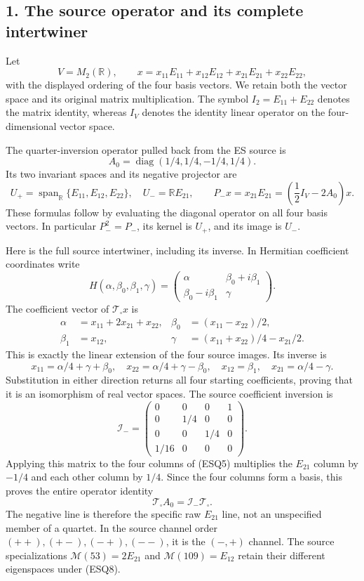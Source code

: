 \documentclass[
  10pt,
  a4paper,
]{article}
\begin{document}
\subsection{1. The source operator and its complete
intertwiner}\label{the-source-operator-and-its-complete-intertwiner}

Let \[
V=M_2(\mathbb R),\qquad
x=x_{11}E_{11}+x_{12}E_{12}+x_{21}E_{21}+x_{22}E_{22},
\tag{ESQ1}
\] with the displayed ordering of the four basis vectors. We retain both
the vector space and its original matrix multiplication. The symbol
\(I_2=E_{11}+E_{22}\) denotes the matrix identity, whereas \(I_V\)
denotes the identity linear operator on the four-dimensional vector
space.

The quarter-inversion operator pulled back from the ES source is \[
A_0=\operatorname{diag}(1/4,1/4,-1/4,1/4).
\tag{ESQ2}
\] Its two invariant spaces and its negative projector are \[
U_+=\operatorname{span}_{\mathbb R}\{E_{11},E_{12},E_{22}\},
\quad U_-=\mathbb RE_{21},\qquad
P_-x=x_{21}E_{21}=\left(\frac12I_V-2A_0\right)x.
\tag{ESQ3}
\] These formulas follow by evaluating the diagonal operator on all four
basis vectors. In particular \(P_-^2=P_-\), its kernel is \(U_+\), and
its image is \(U_-\).

Here is the full source intertwiner, including its inverse. In Hermitian
coefficient coordinates write \[
H(\alpha,\beta_0,\beta_1,\gamma)
=\begin{pmatrix}\alpha&\beta_0+i\beta_1\\
\beta_0-i\beta_1&\gamma\end{pmatrix}.
\tag{ESQ4}
\] The coefficient vector of \(\mathcal T_\square x\) is \[
\begin{aligned}
\alpha&=x_{11}+2x_{21}+x_{22},&
\beta_0&=(x_{11}-x_{22})/2,\\
\beta_1&=x_{12},&
\gamma&=(x_{11}+x_{22})/4-x_{21}/2.
\end{aligned}
\tag{ESQ5}
\] This is exactly the linear extension of the four source images. Its
inverse is \[
x_{11}=\alpha/4+\gamma+\beta_0,\quad
x_{22}=\alpha/4+\gamma-\beta_0,\quad
x_{12}=\beta_1,\quad x_{21}=\alpha/4-\gamma.
\tag{ESQ6}
\] Substitution in either direction returns all four starting
coefficients, proving that it is an isomorphism of real vector spaces.
The source coefficient inversion is \[
\mathcal I_-=
\begin{pmatrix}
0&0&0&1\\0&1/4&0&0\\0&0&1/4&0\\1/16&0&0&0
\end{pmatrix}.
\tag{ESQ7}
\] Applying this matrix to the four columns of (ESQ5) multiplies the
\(E_{21}\) column by \(-1/4\) and each other column by \(1/4\). Since
the four columns form a basis, this proves the entire operator identity
\[
\mathcal T_\square A_0=\mathcal I_-\mathcal T_\square.
\tag{ESQ8}
\] The negative line is therefore the specific raw \(E_{21}\) line, not
an unspecified member of a quartet. In the source channel order
\((++),(+-),(-+),(--)\), it is the \((-,+)\) channel. The source
specializations \(\mathcal M(53)=2E_{21}\) and
\(\mathcal M(109)=E_{12}\) retain their different eigenspaces under
(ESQ8).
\end{document}
